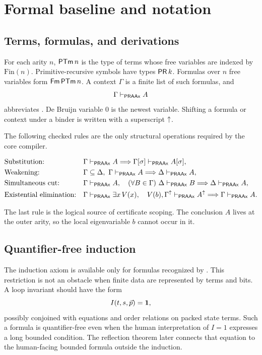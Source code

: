 \section{Formal baseline and notation}
\label{sec:baseline}

\subsection{Terms, formulas, and derivations}

For each arity \(n\), \(\mathsf{PTm}\,n\) is the type of terms whose free variables are
indexed by \(\mathrm{Fin}(n)\).  Primitive-recursive symbols have types
\(\mathsf{PR}\,k\).  Formulas over \(n\) free variables form \(\mathsf{Fm}\,\mathsf{PTm}\,n\).
A context \(\Gamma\) is a finite list of such formulas, and
\[
   \Gamma\mathrel{\vdash_{\mathsf{PRAAx}}} A
\]
abbreviates .  De Bruijn variable \(0\) is the newest
variable.  Shifting a formula or context under a binder is written with a
superscript \(\mathord{\uparrow}\).

The following checked rules are the only structural operations required by the
core compiler.

\begin{align*}
  &\text{Substitution:} &&
  \Gamma\mathrel{\vdash_{\mathsf{PRAAx}}} A
   \Longrightarrow \Gamma[\sigma]\mathrel{\vdash_{\mathsf{PRAAx}}} A[\sigma],\\
  &\text{Weakening:} &&
  \Gamma\subseteq\Delta,\ \Gamma\mathrel{\vdash_{\mathsf{PRAAx}}} A
   \Longrightarrow \Delta\mathrel{\vdash_{\mathsf{PRAAx}}} A,\\
  &\text{Simultaneous cut:} &&
  \Gamma\mathrel{\vdash_{\mathsf{PRAAx}}} A,\quad
  (\forall B\in\Gamma)\ \Delta\mathrel{\vdash_{\mathsf{PRAAx}}} B
   \Longrightarrow \Delta\mathrel{\vdash_{\mathsf{PRAAx}}} A,\\
  &\text{Existential elimination:} &&
  \Gamma\mathrel{\vdash_{\mathsf{PRAAx}}}\exists x\,V(x),\quad
  V(b),\Gamma^{\mathord{\uparrow}}\mathrel{\vdash_{\mathsf{PRAAx}}} A^{\mathord{\uparrow}}
   \Longrightarrow \Gamma\mathrel{\vdash_{\mathsf{PRAAx}}} A.
\end{align*}

The last rule is the logical source of certificate scoping.  The conclusion
\(A\) lives at the outer arity, so the local eigenvariable \(b\) cannot occur
in it.

\subsection{Quantifier-free induction}

The induction axiom is available only for formulas recognized by
.  This restriction is not an obstacle when finite data are
represented by terms and bits.  A loop invariant should have the form
\[
  I(t,s,\vec p)=\mathbf{1},
\]
possibly conjoined with equations and order relations on packed state terms.
Such a formula is quantifier-free even when the human interpretation of
\(I=1\) expresses a long bounded condition.  The reflection theorem later
connects that equation to the human-facing bounded formula outside the
induction.

